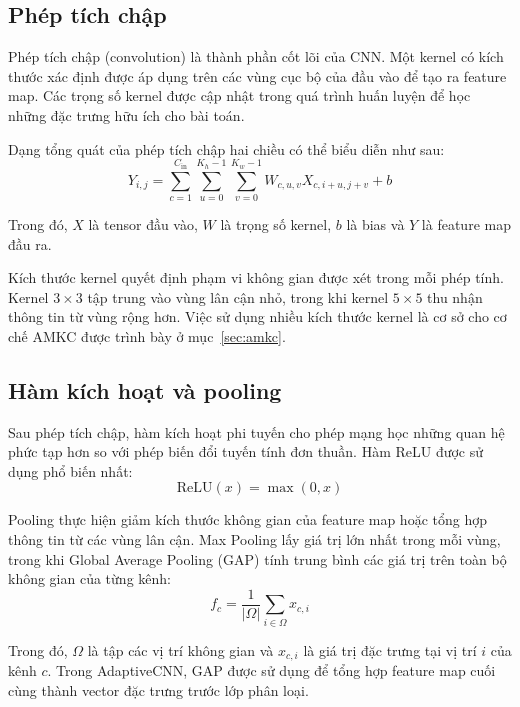 \subsection{Phép tích chập}

Phép tích chập (convolution) là thành phần cốt lõi của CNN. Một kernel có kích thước xác định được áp dụng trên các vùng cục bộ của đầu vào để tạo ra feature map. Các trọng số kernel được cập nhật trong quá trình huấn luyện để học những đặc trưng hữu ích cho bài toán.

Dạng tổng quát của phép tích chập hai chiều có thể biểu diễn như sau:
\begin{equation}
  Y_{i,j}=\sum_{c=1}^{C_{\mathrm{in}}}\sum_{u=0}^{K_h-1}\sum_{v=0}^{K_w-1}W_{c,u,v}X_{c,i+u,j+v}+b
\end{equation}

Trong đó, $X$ là tensor đầu vào, $W$ là trọng số kernel, $b$ là bias và $Y$ là feature map đầu ra.

Kích thước kernel quyết định phạm vi không gian được xét trong mỗi phép tính. Kernel $3\times3$ tập trung vào vùng lân cận nhỏ, trong khi kernel $5\times5$ thu nhận thông tin từ vùng rộng hơn. Việc sử dụng nhiều kích thước kernel là cơ sở cho cơ chế AMKC được trình bày ở mục~\ref{sec:amkc}.

\subsection{Hàm kích hoạt và pooling}

Sau phép tích chập, hàm kích hoạt phi tuyến cho phép mạng học những quan hệ phức tạp hơn so với phép biến đổi tuyến tính đơn thuần. Hàm ReLU được sử dụng phổ biến nhất:
\begin{equation}
  \mathrm{ReLU}(x)=\max(0,x)
\end{equation}

Pooling thực hiện giảm kích thước không gian của feature map hoặc tổng hợp thông tin từ các vùng lân cận. Max Pooling lấy giá trị lớn nhất trong mỗi vùng, trong khi Global Average Pooling (GAP) tính trung bình các giá trị trên toàn bộ không gian của từng kênh:
\begin{equation}
  f_c=\frac{1}{|\Omega|}\sum_{i\in\Omega}x_{c,i}
\end{equation}

Trong đó, $\Omega$ là tập các vị trí không gian và $x_{c,i}$ là giá trị đặc trưng tại vị trí $i$ của kênh $c$. Trong AdaptiveCNN, GAP được sử dụng để tổng hợp feature map cuối cùng thành vector đặc trưng trước lớp phân loại.

